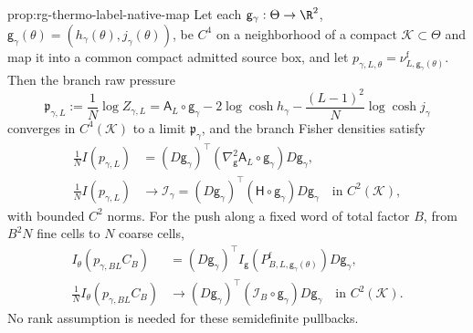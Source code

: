 {prop:rg-thermo-label-native-map}
Let each $\mathsf g_\gamma:\Theta\to\R^2$,
$\mathsf g_\gamma(\theta)=(h_\gamma(\theta),j_\gamma(\theta))$, be $C^4$ on a
neighborhood of a compact $\mathcal K\subset\Theta$ and map it into a common
compact admitted source box, and let $p_{\gamma,L,\theta}=\nu^{\mathrm f}_{L,\mathsf g_\gamma(\theta)}$.
Then the branch raw pressure
\begin{equation}
 \mathfrak p_{\gamma,L}:=\frac1N\log Z_{\gamma,L}
 =\mathsf A_L\circ\mathsf g_\gamma-2\log\cosh h_\gamma
   -\frac{(L-1)^2}{N}\log\cosh j_\gamma
 \label{eq:rg-thermo-label-raw-pressure}
\end{equation}
converges in $C^4(\mathcal K)$ to a limit $\mathfrak p_\gamma$, and the branch
Fisher densities satisfy
\begin{align}
 \frac1NI(p_{\gamma,L})
 &=(D\mathsf g_\gamma)^\top
       (\nabla^2_{\mathsf g}\mathsf A_L\circ\mathsf g_\gamma)D\mathsf g_\gamma,
 \label{eq:rg-thermo-label-native-pullback}\\
 \frac1NI(p_{\gamma,L})
 &\longrightarrow\mathcal I_\gamma
 =(D\mathsf g_\gamma)^\top(\mathsf H\circ\mathsf g_\gamma)D\mathsf g_\gamma
 \quad\text{in }C^2(\mathcal K),
 \label{eq:rg-thermo-draft-native-density}
\end{align}
with bounded $C^2$ norms. For the push along a fixed word of total factor
$B$, from $B^2N$ fine cells to $N$ coarse cells,
\begin{align}
 I_\theta(p_{\gamma,BL}C_B)
 &=(D\mathsf g_\gamma)^\top
 I_{\mathsf g}(P^{\mathrm f}_{B,L,\mathsf g_\gamma(\theta)})D\mathsf g_\gamma,
 \label{eq:rg-thermo-label-push-pullback}\\
 \frac1N I_\theta(p_{\gamma,BL}C_B)
 &\longrightarrow (D\mathsf g_\gamma)^\top
      (\mathcal I_B\circ\mathsf g_\gamma)D\mathsf g_\gamma
 \quad\text{in }C^2(\mathcal K).
 \label{eq:rg-thermo-label-push-input}
\end{align}
No rank assumption is needed for these semidefinite pullbacks.

